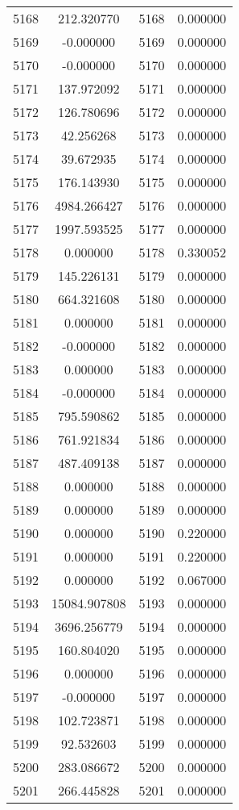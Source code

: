 \documentclass[12pt]{article}
\begin{document}
\begin{longtable}{@{}cccc@{}}
5168 & 212.320770 & 5168 & 0.000000 \\
5169 & -0.000000 & 5169 & 0.000000 \\
5170 & -0.000000 & 5170 & 0.000000 \\
5171 & 137.972092 & 5171 & 0.000000 \\
5172 & 126.780696 & 5172 & 0.000000 \\
5173 & 42.256268 & 5173 & 0.000000 \\
5174 & 39.672935 & 5174 & 0.000000 \\
5175 & 176.143930 & 5175 & 0.000000 \\
5176 & 4984.266427 & 5176 & 0.000000 \\
5177 & 1997.593525 & 5177 & 0.000000 \\
5178 & 0.000000 & 5178 & 0.330052 \\
5179 & 145.226131 & 5179 & 0.000000 \\
5180 & 664.321608 & 5180 & 0.000000 \\
5181 & 0.000000 & 5181 & 0.000000 \\
5182 & -0.000000 & 5182 & 0.000000 \\
5183 & 0.000000 & 5183 & 0.000000 \\
5184 & -0.000000 & 5184 & 0.000000 \\
5185 & 795.590862 & 5185 & 0.000000 \\
5186 & 761.921834 & 5186 & 0.000000 \\
5187 & 487.409138 & 5187 & 0.000000 \\
5188 & 0.000000 & 5188 & 0.000000 \\
5189 & 0.000000 & 5189 & 0.000000 \\
5190 & 0.000000 & 5190 & 0.220000 \\
5191 & 0.000000 & 5191 & 0.220000 \\
5192 & 0.000000 & 5192 & 0.067000 \\
5193 & 15084.907808 & 5193 & 0.000000 \\
5194 & 3696.256779 & 5194 & 0.000000 \\
5195 & 160.804020 & 5195 & 0.000000 \\
5196 & 0.000000 & 5196 & 0.000000 \\
5197 & -0.000000 & 5197 & 0.000000 \\
5198 & 102.723871 & 5198 & 0.000000 \\
5199 & 92.532603 & 5199 & 0.000000 \\
5200 & 283.086672 & 5200 & 0.000000 \\
5201 & 266.445828 & 5201 & 0.000000 \\

\end{longtable}
\end{document}
